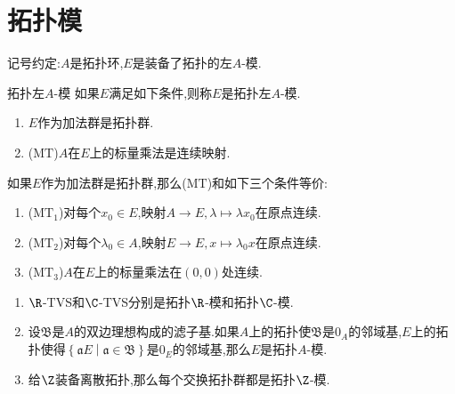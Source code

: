 \section{拓扑模}

记号约定:$A$是拓扑环,$E$是装备了拓扑的左$A$-模.

\begin{definition}{拓扑左$A$-模}{}
	如果$E$满足如下条件,则称$E$是拓扑左$A$-模.
	\begin{enumerate}
		\item $E$作为加法群是拓扑群.
		\item ($\mathrm{MT}$)$A$在$E$上的标量乘法是连续映射.
	\end{enumerate}
\end{definition}

\begin{remark}{}{}
	如果$E$作为加法群是拓扑群,那么($\mathrm{MT}$)和如下三个条件等价:
	\begin{enumerate}
		\item ($\mathrm{MT}_{1}$)对每个$x_{0}\in E$,映射$A\to E,\lambda\mapsto\lambda x_{0}$在原点连续.
		\item ($\mathrm{MT}_{2}$)对每个$\lambda_{0}\in A$,映射$E\to E,x\mapsto\lambda_{0}x$在原点连续.
		\item ($\mathrm{MT}_{3}$)$A$在$E$上的标量乘法在$\left(0,0\right)$处连续.
	\end{enumerate}
\end{remark}

\begin{example}{}{}
	\begin{enumerate}
		\item $\R$-TVS和$\C$-TVS分别是拓扑$\R$-模和拓扑$\C$-模.
		\item 设$\mathfrak{B}$是$A$的双边理想构成的滤子基.如果$A$上的拓扑使$\mathfrak{B}$是$0_{A}$的邻域基,$E$上的拓扑使得$\left\{\mathfrak{a}E\middle|\mathfrak{a}\in\mathfrak{B}\right\}$是$0_{E}$的邻域基,那么$E$是拓扑$A$-模.
		\item 给$\Z$装备离散拓扑,那么每个交换拓扑群都是拓扑$\Z$-模.
	\end{enumerate}
\end{example}

